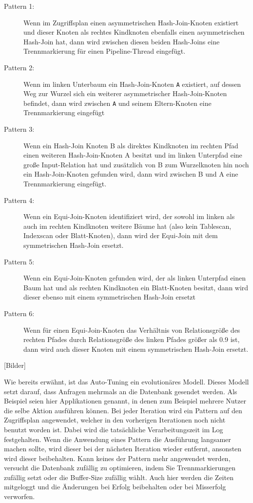 \begin{description}
\item[Pattern 1:] Wenn im Zugriffsplan einen asymmetrischen Hash-Join-Knoten existiert und dieser Knoten als rechtes Kindknoten ebenfalls einen asymmetrischen Hash-Join hat, dann wird zwischen diesen beiden Hash-Joins eine Trennmarkierung für einen Pipeline-Thread eingefügt.
\item[Pattern 2:] Wenn im linken Unterbaum ein Hash-Join-Knoten \texttt{A} existiert, auf dessen Weg zur Wurzel sich ein weiterer asymmetrischer Hash-Join-Knoten befindet, dann wird zwischen \texttt{A} und seinem Eltern-Knoten eine Trennmarkierung eingefügt
\item[Pattern 3:] Wenn ein Hash-Join Knoten B als direktes Kindknoten im rechten Pfad einen weiteren Hash-Join-Knoten A besitzt und im linken Unterpfad eine große Input-Relation hat und zusätzlich von B zum Wurzelknoten hin noch ein Hash-Join-Knoten gefunden wird, dann wird zwischen B und A eine Trennmarkierung eingefügt.
\item[Pattern 4:] Wenn ein Equi-Join-Knoten identifiziert wird, der sowohl im linken als auch im rechten Kindknoten weitere Bäume hat (also kein Tablescan, Indexscan oder Blatt-Knoten), dann wird der Equi-Join mit dem symmetrischen Hash-Join ersetzt.
\item[Pattern 5:] Wenn ein Equi-Join-Knoten gefunden wird, der als linken Unterpfad einen Baum hat und als rechten Kindknoten ein Blatt-Knoten besitzt, dann wird dieser ebenso mit einem symmetrischen Hash-Join ersetzt
\item[Pattern 6:] Wenn für einen Equi-Join-Knoten das Verhältnis von Relationsgröße des rechten Pfades durch Relationsgröße des linken Pfades größer als 0.9 ist, dann wird auch dieser Knoten mit einem symmetrischen Hash-Join ersetzt.
\end{description}

[Bilder]

Wie bereits erwähnt, ist das Auto-Tuning ein evolutionäres Modell. Dieses Modell setzt darauf, dass Anfragen mehrmals an die Datenbank gesendet werden. Als Beispiel seien hier Applikationen genannt, in denen zum Beispiel mehrere Nutzer die selbe Aktion ausführen können. Bei jeder Iteration wird ein Pattern auf den Zugriffsplan angewendet, welcher in den vorherigen Iterationen noch nicht benutzt worden ist. Dabei wird die tatsächliche Verarbeitungszeit im Log festgehalten. Wenn die Anwendung eines Pattern die Ausführung langsamer machen sollte, wird dieser bei der nächsten Iteration wieder entfernt, ansonsten wird dieser beibehalten. Kann keines der Pattern mehr angewendet werden, versucht die Datenbank zufällig zu optimieren, indem Sie Trennmarkierungen zufällig setzt oder die Buffer-Size zufällig wählt. Auch hier werden die Zeiten mitgeloggt und die Änderungen bei Erfolg beibehalten oder bei Misserfolg verworfen.

